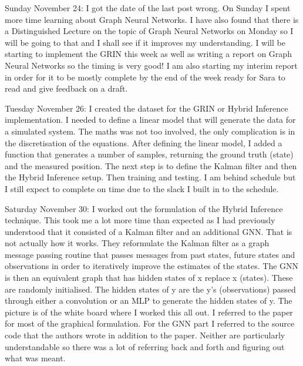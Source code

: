 \documentclass[]{../resources/final_report}
\begin{document}
\begin{appendices}
  Sunday November 24: I got the date of the last post wrong. On Sunday I spent more time learning about Graph Neural Networks. I have also found that there is a Distinguished Lecture on the topic of Graph Neural Networks on Monday so I will be going to that and I shall see if it improves my understanding. I will be starting to implement the GRIN this week as well as writing a report on Graph Neural Networks so the timing is very good! I am also starting my interim report in order for it to be mostly complete by the end of the week ready for Sara to read and give feedback on a draft.
  
  Tuesday November 26: I created the dataset for the GRIN or Hybrid Inference implementation. I needed to define a linear model that will generate the data for a simulated system. The maths was not too involved, the only complication is in the discretisation of the equations. After defining the linear model, I added a function that generates a number of samples, returning the ground truth (state) and the measured position. The next step is to define the Kalman filter and then the Hybrid Inference setup. Then training and testing. I am behind schedule but I still expect to complete on time due to the slack I built in to the schedule.
  
  Saturday November 30: I worked out the formulation of the Hybrid Inference technique. This took me a lot more time than expected as I had previously understood that it consisted of a Kalman filter and an additional GNN. That is not actually how it works. They reformulate the Kalman filter as a graph message passing routine that passes messages from past states, future states and observations in order to iteratively improve the estimates of the states. The GNN is then an equivalent graph that has hidden states of x replace x (states). These are randomly initialised. The hidden states of y are the y’s (observations) passed through either a convolution or an MLP to generate the hidden states of y. The picture is of the white board where I worked this all out. I referred to the paper for most of the graphical formulation. For the GNN part I referred to the source code that the authors wrote in addition to the paper. Neither are particularly understandable so there was a lot of referring back and forth and figuring out what was meant.
  

\end{appendices}
\end{document}
